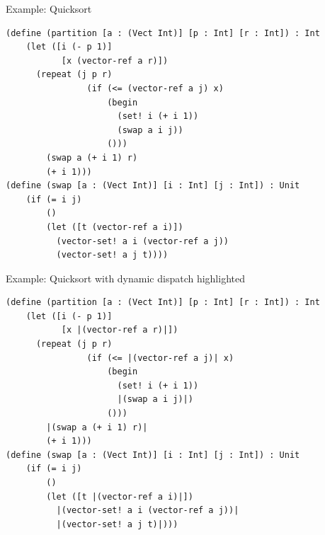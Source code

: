 \documentclass[12pt,dvipsnames]{beamer}
\begin{document}

\begin{frame}[fragile]{Example: Quicksort}

\begin{lstlisting}
(define (partition [a : (Vect Int)] [p : Int] [r : Int]) : Int
    (let ([i (- p 1)]
           [x (vector-ref a r)])
      (repeat (j p r)
                (if (<= (vector-ref a j) x)
                    (begin
                      (set! i (+ i 1))
                      (swap a i j))
                    ()))
        (swap a (+ i 1) r)
        (+ i 1)))
(define (swap [a : (Vect Int)] [i : Int] [j : Int]) : Unit
    (if (= i j)
        ()
        (let ([t (vector-ref a i)])
          (vector-set! a i (vector-ref a j))
          (vector-set! a j t))))
\end{lstlisting}
\end{frame}

\begin{frame}[fragile]{Example: Quicksort with dynamic dispatch highlighted}

\begin{lstlisting}
(define (partition [a : (Vect Int)] [p : Int] [r : Int]) : Int
    (let ([i (- p 1)]
           [x |(vector-ref a r)|])
      (repeat (j p r)
                (if (<= |(vector-ref a j)| x)
                    (begin
                      (set! i (+ i 1))
                      |(swap a i j)|)
                    ()))
        |(swap a (+ i 1) r)|
        (+ i 1)))
(define (swap [a : (Vect Int)] [i : Int] [j : Int]) : Unit
    (if (= i j)
        ()
        (let ([t |(vector-ref a i)|])
          |(vector-set! a i (vector-ref a j))|
          |(vector-set! a j t)|)))
\end{lstlisting}
\end{frame}
\end{document}
